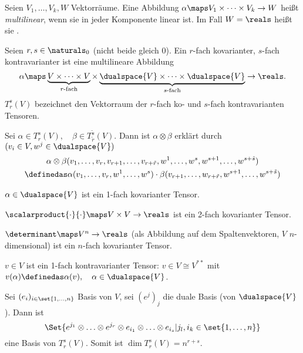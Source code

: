 \begin{definition}
Seien \( V_1,\dotsc ,V_k,W \) Vektorräume. 
Eine Abbildung \( \alpha\maps V_1\times \dotsb \times V_k\to W \) heißt \emph{multilinear}, wenn sie in jeder Komponente linear ist.
Im Fall \( W=\reals \) heißt sie .

Seien \( r,s\in \naturals_0 \) (nicht beide gleich 0).
Ein \( r \)-fach kovarianter, \( s \)-fach kontravarianter  ist eine multilineare Abbildung
\begin{equation*}
    \alpha\maps \underbrace{V\times \dotsb \times V}_{\text{\( r \)-fach}}\times 
    \underbrace{\dualspace{V}\times \dotsb \times \dualspace{V}}_{\text{\( s \)-fach}}
    \to\reals.
\end{equation*}
\( T_r^s(V) \) bezeichnet den Vektorraum der \( r \)-fach ko- und \( s \)-fach kontravarianten Tensoren.
\end{definition}

\begin{definition}
Sei \( \alpha\in T_r^s(V),\quad \beta\in T_{\tilde{r}}^{\tilde{s}}(V) \).
Dann ist \( \alpha\otimes\beta \) erklärt durch \( (v_i\in V,w^j\in \dualspace{V}) \)
\begin{gather*}
    \alpha\otimes\beta(v_1,\ldots ,v_r,v_{r+1},\ldots ,v_{r+\tilde{r}},
    w^1,\ldots ,w^s,w^{s+1},\ldots ,w^{s+\tilde{s}})\\
    \definedas \alpha(v_1,\ldots ,v_r,w^1,\ldots ,w^s)\cdot 
    \beta(v_{r+1},\ldots ,w_{r+\tilde{r}},w^{s+1},\ldots ,w^{s+\tilde{s}})
\end{gather*}
\end{definition}

\begin{beispiel*}
\( \alpha\in \dualspace{V} \) ist ein 1-fach kovarianter Tensor.

\( \scalarproduct{\cdot}{\cdot}\maps V\times V\to\reals \) ist ein 2-fach kovarianter Tensor.

\( \determinant\maps V^n\to\reals \) (als Abbildung auf dem Spaltenvektoren, \( V \) \( n \)-dimensional) ist ein \( n \)-fach kovarianter Tensor.

\( v\in V \) ist ein 1-fach kontravarianter Tensor:
\( v\in V\cong V^{**} \) mit \( v(\alpha)\definedas \alpha(v),\quad \alpha\in \dualspace{V} \).
\end{beispiel*}

\begin{satz}\label{basis_tensorraum}
Sei \( (e_i)_{i\in\set{1,\ldots ,n}} \) Basis von \( V \), sei \( (e^j)_j \) die duale Basis (von \( \dualspace{V} \)).
Dann ist 
\begin{equation*}
    \Set{e^{j_1}\otimes\ldots \otimes e^{j_r}\otimes e_{i_1}\otimes\ldots \otimes e_{i_s}| j_l,i_k\in\set{1,\ldots ,n} }
\end{equation*}
eine Basis von \( T^s_r(V) \).
Somit ist \( \dim T^s_r(V)=n^{r+s} \).    
\end{satz}

